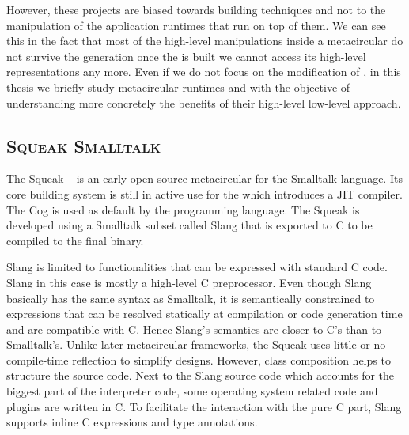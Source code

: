 However, these projects are biased towards \VM building techniques and not to the manipulation of the application runtimes that run on top of them. We can see this in the fact that most of the high-level manipulations inside a metacircular \VMs do not survive the \VM generation \ie once the \VM is built we cannot access its high-level representations any more.  Even if we do not focus on the modification of \VMs, in this thesis we briefly study metacircular runtimes and \VMs with the objective of understanding more concretely the benefits of their high-level low-level approach.

\subsection*{\textsc{Squeak Smalltalk \VM}}
The Squeak \VM~\cite{Inga97a} is an early open source metacircular \VM for the Smalltalk language. 
Its core building system is still in active use for the  which introduces a JIT compiler.
The Cog \VM is used as default by the  programming language.
The Squeak \VM is developed using a Smalltalk subset called Slang that is exported to C to be compiled to the final \VM binary.

Slang is limited to functionalities that can be expressed with standard C code.
Slang in this case is mostly a high-level C preprocessor.
Even though Slang basically has the same syntax as Smalltalk, it is semantically constrained to expressions that can be resolved statically at compilation or code generation time and are compatible with C.
Hence Slang's semantics are closer to C's than to Smalltalk's.
Unlike later metacircular frameworks, the Squeak \VM uses little or no compile-time reflection to simplify \VM designs.
However, class composition helps to structure the source code.
Next to the Slang source code which accounts for the biggest part of the interpreter code, some operating system related code and plugins are written in C.
To facilitate the interaction with the pure C part, Slang supports inline C expressions and type annotations.

